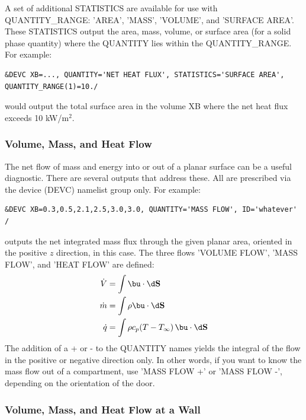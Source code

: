 \documentclass[11pt]{book}
\begin{document}
A set of additional {\ct STATISTICS} are available for use with {\ct QUANTITY\_RANGE}: {\ct 'AREA'}, {\ct 'MASS'}, {\ct 'VOLUME'}, and {\ct 'SURFACE AREA'}.  These {\ct STATISTICS} output the area, mass, volume, or surface area (for a solid phase quantity) where the {\ct QUANTITY} lies within the {\ct QUANTITY\_RANGE}.  For example:

\begin{lstlisting}
&DEVC XB=..., QUANTITY='NET HEAT FLUX', STATISTICS='SURFACE AREA', QUANTITY_RANGE(1)=10./
\end{lstlisting}
would output the total surface area in the volume {\ct XB} where the net heat flux exceeds 10 kW/m$^2$.

\subsubsection{Volume, Mass, and Heat Flow}
\label{info:flows}

The net flow of mass and energy into or out of a planar surface can be a useful diagnostic. There are several outputs that address these. All are prescribed via
the device ({\ct DEVC}) namelist group only. For example:

\begin{lstlisting}
&DEVC XB=0.3,0.5,2.1,2.5,3.0,3.0, QUANTITY='MASS FLOW', ID='whatever' /
\end{lstlisting}

\noindent
outputs the net integrated mass flux through the given planar area, oriented in the positive $z$ direction, in this case. The three flows {\ct 'VOLUME FLOW'}, {\ct 'MASS FLOW'},
and {\ct 'HEAT FLOW'} are defined:
\begin{align}
\dot{V} &= \int \bu \cdot \d \mathbf{S}  \\
\dot{m} &= \int \rho \bu \cdot \d \mathbf{S} \\
\dot{q} &= \int \rho c_p (T-T_\infty) \, \bu \cdot \d \mathbf{S}
\end{align}
The addition of a {\ct +} or {\ct -} to the {\ct QUANTITY} names yields the integral of the flow in the positive or negative direction only. In other words, if you want to know the mass flow out of a compartment, use {\ct 'MASS FLOW +'} or {\ct 'MASS FLOW -'}, depending on the orientation of the door.

\subsubsection{Volume, Mass, and Heat Flow at a Wall}
\label{info:wallflows}
\end{document}
